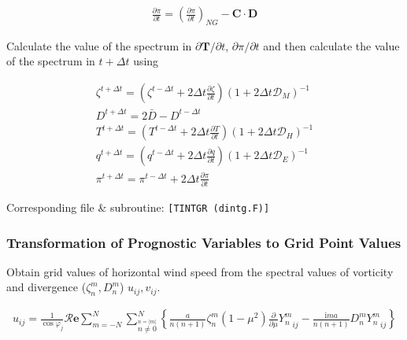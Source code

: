 \begin{eqnarray}
  \frac{\partial \pi}{\partial t}
      =   \left( \frac{\partial \pi}
                        {\partial t}       \right)_{NG}  
         - {\mathbf{C}} \cdot {\mathbf{D}}
\end{eqnarray}

Calculate the value of the spectrum in \(\partial {\mathbf{T}}/\partial t\), \(\partial \pi/\partial t\) and then calculate the value of the spectrum in \(t+\Delta t\) using

\begin{eqnarray}
  \zeta^{t+\Delta t}  =  \left( \zeta^{t-\Delta t}
                                +   2 \Delta t \frac{\partial{\zeta}}{\partial {t}} \right)
                          ( 1 + 2 \Delta t {\mathcal D}_M )^{-1} \\
  D^{t+\Delta t}  =  2 \bar{D} - D^{t-\Delta t}\\
  T^{t+\Delta t}  =  \left( T^{t-\Delta t}
                                +  2 \Delta t  \frac{\partial{T}}{\partial {t}} \right)
                          ( 1 + 2 \Delta t {\mathcal D}_H )^{-1} \\
  q^{t+\Delta t}  =  \left( q^{t-\Delta t}
                                +  2 \Delta t \frac{\partial{q}}{\partial {t}} \right)
                          ( 1 + 2 \Delta t {\mathcal D}_E )^{-1} \\
\pi^{t+\Delta t}  =  \pi^{t-\Delta t}
                                +  2 \Delta t \frac{\partial{\pi}}{\partial {t}}
\end{eqnarray}

Corresponding file \& subroutine: \texttt{{[}TINTGR\ (dintg.F){]}}

\hypertarget{transformation-of-prognostic-variables-to-grid-point-values}{%
\subsubsection{Transformation of Prognostic Variables to Grid Point Values}\label{transformation-of-prognostic-variables-to-grid-point-values}}

Obtain grid values of horizontal wind speed from the spectral values of vorticity and divergence (\(\zeta_n^m, D_n^m\)) \(u_{ij}, v_{ij}\).

\begin{eqnarray}
  u_{ij}
  =  \frac{1}{\cos \varphi_j}
     {\mathcal R}{\mathbf{e}} \sum_{m=-N}^{N}
                       \sum_{\stackrel{n=|m|}{n \neq 0}}^{N}
    \left\{
             \frac{a}{n(n+1)} \zeta_n^m
            (1-\mu^{2}) \frac{\partial{}}{\partial {\mu}} {Y_n^m}_{ij}
          -  \frac{\mathrm{i}m a}{n(n+1)} D_n^m {Y_n^m}_{ij}
    \right\}
\end{eqnarray}

